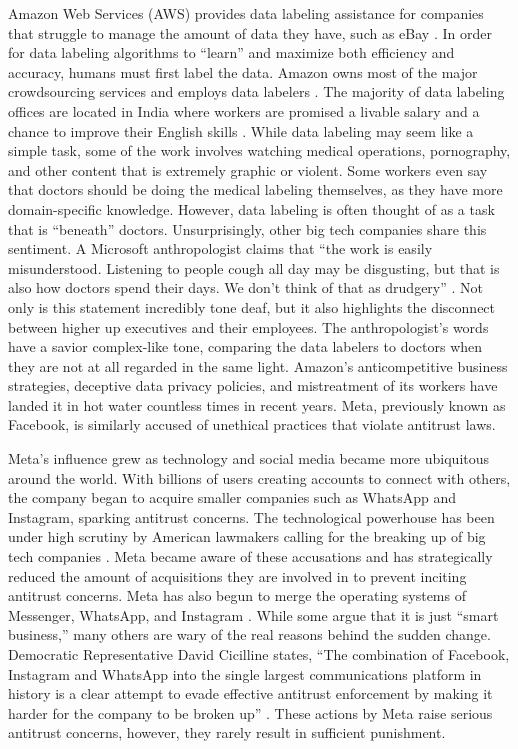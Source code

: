 \documentclass[twoside]{article}
\begin{document}
Amazon Web Services (AWS) provides data labeling assistance for companies that struggle to manage the amount of data they have, such as eBay \cite{aws}. In order for data labeling algorithms to ``learn'' and maximize both efficiency and accuracy, humans must first label the data. Amazon owns most of the major crowdsourcing services and employs data labelers \cite{ai}. The majority of data labeling offices are located in India where workers are promised a livable salary and a chance to improve their English skills \cite{ai}. While data labeling may seem like a simple task, some of the work involves watching medical operations, pornography, and other content that is extremely graphic or violent. Some workers even say that doctors should be doing the medical labeling themselves, as they have more domain-specific knowledge. However, data labeling is often thought of as a task that is “beneath” doctors. Unsurprisingly, other big tech companies share this sentiment. A Microsoft anthropologist claims that “the work is easily misunderstood. Listening to people cough all day may be disgusting, but that is also how doctors spend their days. We don’t think of that as drudgery” \cite{ai}. Not only is this statement incredibly tone deaf, but it also highlights the disconnect between higher up executives and their employees. The anthropologist’s words have a savior complex-like tone, comparing the data labelers to doctors when they are not at all regarded in the same light. Amazon's anticompetitive business strategies, deceptive data privacy policies, and mistreatment of its workers have landed it in hot water countless times in recent years. Meta, previously known as Facebook, is similarly accused of unethical practices that violate antitrust laws.\newpage

Meta's influence grew as technology and social media became more ubiquitous around the world. With billions of users creating accounts to connect with others, the company began to acquire smaller companies such as WhatsApp and Instagram, sparking antitrust concerns. The technological powerhouse has been under high scrutiny by American lawmakers calling for the breaking up of big tech companies \cite{facebook}. Meta became aware of these accusations and has strategically reduced the amount of acquisitions they are involved in to prevent inciting antitrust concerns. Meta has also begun to merge the operating systems of Messenger, WhatsApp, and Instagram \cite{facebook}. While some argue that it is just “smart business,” many others are wary of the real reasons behind the sudden change. Democratic Representative David Cicilline states, “The combination of Facebook, Instagram and WhatsApp into the single largest communications platform in history is a clear attempt to evade effective antitrust enforcement by making it harder for the company to be broken up” \cite{facebook}. These actions by Meta raise serious antitrust concerns, however, they rarely result in sufficient punishment.
\end{document}

